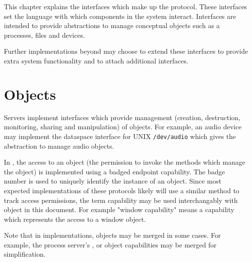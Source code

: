 %
%
%

This chapter explains the interfaces which make up the  protocol. These interfaces set the language with which components in the system interact. Interfaces are intended to provide abstractions to manage conceptual objects such as a processes, files and devices.

Further implementations beyond  may choose to extend these interfaces to provide extra system functionality and to attach additional interfaces.

\section{Objects}

Servers implement interfaces which provide management (creation, destruction, monitoring, sharing and manipulation) of objects. For example, an audio device may implement the dataspace interface for UNIX \texttt{/dev/audio} which gives the abstraction to manage audio objects.

In , the access to an object (the permission to invoke the methods which manage the object) is implemented using a badged endpoint capability. The badge number is used to uniquely identify the instance of an object. Since most expected implementations of these protocols likely will use a similar method to track access permissions, the term capability may be used interchangably with object in this document. For example "window capability" means a capability which represents the access to a window object.

Note that in implementations, objects may be merged in some cases. For example, the process server's ,  or  object capabilities may be merged for simplification.

